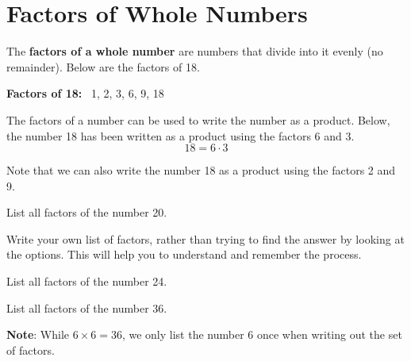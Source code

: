 \documentclass{ximera}[font=12pt]  %
\begin{document}
\section*{Factors of Whole Numbers}

The \textbf{factors of a whole number} are numbers that divide into it evenly (no remainder).  Below are the factors of 18.

\begin{center}
    \textbf{Factors of 18:} \ 1, 2, 3, 6, 9, 18
\end{center}

The factors of a number can be used to write the number as a product.  Below, the number 18 has been written as a product using the factors 6 and 3.
\[ 18 =  6 \cdot 3 \]

Note that we can also write the number 18 as a product using the factors 2 and 9.

\begin{problem}
List all factors of the number 20.

\begin{multipleChoice}
\end{multipleChoice}

\begin{hint}
Write your own list of factors, rather than trying to find the answer by looking at the options.  This will help you to understand and 
remember the process. 
\end{hint}

\end{problem}

\begin{problem}
List all factors of the number 24.
\begin{multipleChoice}
\end{multipleChoice}
\end{problem}


\begin{problem}
List all factors of the number 36.
\begin{multipleChoice}
\end{multipleChoice}
\begin{feedback}
    \textbf{Note}:  While $6 \times 6 = 36$, we only list the number 6 once when writing out the set of factors.
\end{feedback}
\end{problem}
\end{document}
